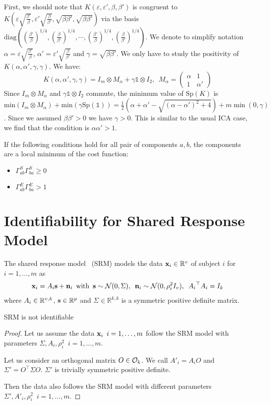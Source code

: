 \documentclass{report}
\begin{document}
First, we should note that $K(\varepsilon, \varepsilon', \beta, \beta') $ is congruent to $K(\varepsilon \sqrt{\frac{\beta'}{\beta}}, \varepsilon' \sqrt{\frac{\beta}{\beta'}}, \sqrt{\beta\beta'}, \sqrt{\beta\beta'})$ via the basis $\text{diag}((\frac{\beta'}{\beta})^{1/4}, (\frac{\beta}{\beta'})^{1/4}, \cdots,(\frac{\beta'}{\beta})^{1/4}, (\frac{\beta}{\beta'})^{1/4})$.
%
We denote to simplify notation $\alpha = \varepsilon \sqrt{\frac{\beta'}{\beta}}$, $\alpha' = \varepsilon' \sqrt{\frac{\beta}{\beta'}}$ and $\gamma = \sqrt{\beta\beta'}$. We only have to study the positivity of $K(\alpha, \alpha', \gamma, \gamma)$.
We have:
$$
K(\alpha, \alpha', \gamma, \gamma) =  I_m  \otimes M_\alpha+ \gamma  \mathbb{1}\otimes I_2, \enspace M_\alpha = 
\begin{pmatrix}
\alpha & 1 \\
1 & \alpha'
\end{pmatrix}
$$
Since $I_m\otimes M_\alpha$ and $\gamma \mathbb{1}\otimes I_2$ commute, the minimum value of $\text{Sp}(K)$ is $\text{min}(I_m\otimes M_\alpha) + \text{min}(\gamma\text{Sp}(\mathbb{1}))=\frac12(\alpha + \alpha' - \sqrt{(\alpha - \alpha')^2 + 4}) + m\min(0, \gamma)$.
Since we assumed $\beta \beta' > 0$ we have $\gamma > 0$. This is similar to the usual ICA case, we find that the condition is $\alpha\alpha' > 1$.

If the following conditions hold for all pair of components $a, b$, the components are a local minimum of the cost function:
\begin{itemize}
    \item $\Gamma^S_{ab}\Gamma^S_{ba}\geq 0$
    \item $\Gamma^E_{ab}\Gamma^E_{ba} > 1$
\end{itemize}
\section{Identifiability for Shared Response Model}
\label{sec:app_identifiability}
The shared response model~\cite{chen2015reduced} (SRM) models the data $\mathbf{x}_i \in \mathbb{R}^v$ of subject $i$ for $i = 1,\dots, m$ as
\begin{align*}
    \mathbf{x}_i = A_i \mathbf{s} + \mathbf{n}_i \enspace \text{with} \enspace \mathbf{s} \sim \mathcal{N}(0, \Sigma), \enspace\mathbf{n}_i \sim \mathcal{N}(0, \rho_i^2 I_v), \enspace {A_i}^{\top}A_i = I_k
\end{align*}
where $A_i \in \mathbb{R}^{v, k}$, $\mathbf{s} \in \mathbb{R}^p$ and  $\Sigma \in \mathbb{R}^{k, k}$ is a symmetric positive definite matrix.

\begin{proposition}
SRM is not identifiable
\end{proposition}
\begin{proof}
Let us assume the data $\mathbf{x}_i \enspace i=1, \dots, m$ follow the SRM model with parameters $\Sigma, A_i, \rho_i^2 \enspace i=1, \dots, m$. 

Let us consider an orthogonal matrix $O \in \mathcal{O}_k$.
We call $A'_i = A_i O$ and $\Sigma' = O^{\top} \Sigma O$. 
$\Sigma'$ is trivially symmetric positive definite.

Then the data also follows the SRM model with different parameters $\Sigma', A'_i, \rho_i^2 \enspace i=1, \dots, m$.
\end{proof}
\end{document}
